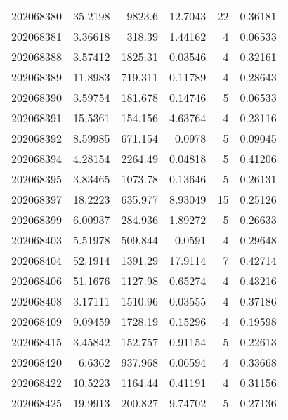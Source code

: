 \begin{tabular}{rrrrrr}
 202068380 &         35.2198  &     9823.6    &           12.7043  &          22 & 0.36181 \\
 202068381 &          3.36618 &      318.39   &            1.44162 &           4 & 0.06533 \\
 202068388 &          3.57412 &     1825.31   &            0.03546 &           4 & 0.32161 \\
 202068389 &         11.8983  &      719.311  &            0.11789 &           4 & 0.28643 \\
 202068390 &          3.59754 &      181.678  &            0.14746 &           5 & 0.06533 \\
 202068391 &         15.5361  &      154.156  &            4.63764 &           4 & 0.23116 \\
 202068392 &          8.59985 &      671.154  &            0.0978  &           5 & 0.09045 \\
 202068394 &          4.28154 &     2264.49   &            0.04818 &           5 & 0.41206 \\
 202068395 &          3.83465 &     1073.78   &            0.13646 &           5 & 0.26131 \\
 202068397 &         18.2223  &      635.977  &            8.93049 &          15 & 0.25126 \\
 202068399 &          6.00937 &      284.936  &            1.89272 &           5 & 0.26633 \\
 202068403 &          5.51978 &      509.844  &            0.0591  &           4 & 0.29648 \\
 202068404 &         52.1914  &     1391.29   &           17.9114  &           7 & 0.42714 \\
 202068406 &         51.1676  &     1127.98   &            0.65274 &           4 & 0.43216 \\
 202068408 &          3.17111 &     1510.96   &            0.03555 &           4 & 0.37186 \\
 202068409 &          9.09459 &     1728.19   &            0.15296 &           4 & 0.19598 \\
 202068415 &          3.45842 &      152.757  &            0.91154 &           5 & 0.22613 \\
 202068420 &          6.6362  &      937.968  &            0.06594 &           4 & 0.33668 \\
 202068422 &         10.5223  &     1164.44   &            0.41191 &           4 & 0.31156 \\
 202068425 &         19.9913  &      200.827  &            9.74702 &           5 & 0.27136 \\

\end{tabular}
